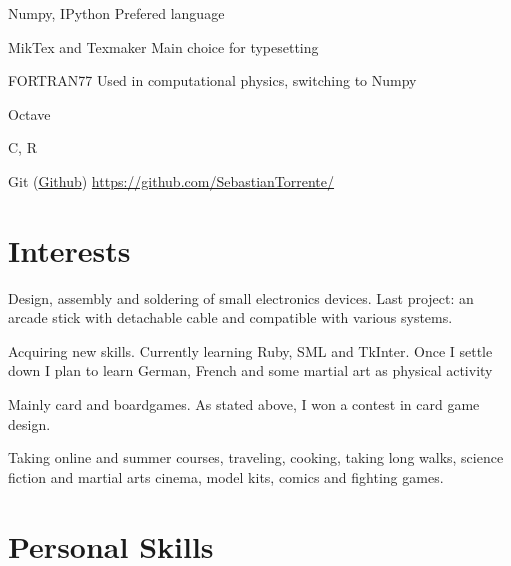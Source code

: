 \documentclass[11pt,a4paper,roman]{moderncv}
\begin{document}
	{Numpy, IPython}
	{Prefered language}

\cvitemwithcomment{\LaTeX}
	{MikTex and Texmaker}
	{Main choice for typesetting}

	{FORTRAN77}
	{Used in computational physics, switching to Numpy}

	{Octave}
	{}

	{C, R}
	{}


{Git (\href{https://github.com/SebastianTorrente/}{Github})}
{\href{https://github.com/SebastianTorrente/}{https://github.com/SebastianTorrente/}}


\section{Interests}

	{Design, assembly and soldering of small electronics devices. Last project: an arcade stick with detachable cable and compatible with various systems.}

	{Acquiring new skills. Currently learning Ruby, SML and TkInter.
	Once I settle down I plan to learn German, French and some martial art as physical activity}

	{Mainly card and boardgames. As stated above, I won a contest in card game design.}

	{Taking online and summer courses, traveling, cooking, taking long walks, science fiction and martial arts cinema, model kits, comics and fighting games.}



\section{Personal Skills}
\end{document}
